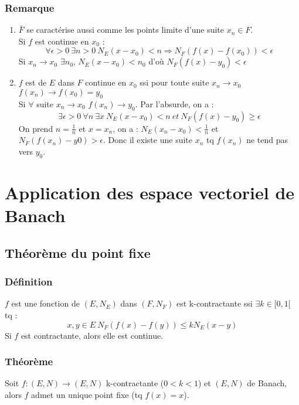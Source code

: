 \documentclass[a4paper, oneside]{report}
\newcommand{\ev}{espace vectoriel }
\newcommand{\fracun}[1]{\frac{1}{#1}}
\begin{document}
\subsubsection{Remarque}
\begin{enumerate}
\item $\bar{F}$ se caractérise aussi comme les points limite d'une suite $x_n\in F$.\\

Si $f$ est continue en $x_0$ :
$$\forall \epsilon >0~\exists n>0~N_E(x-x_0)<n\Rightarrow N_F(f(x)-f(x_0)) < \epsilon$$
Si $x_n\rightarrow x_0$ $\exists n_0$, $N_E(x-x_0)<n_0$ d'où $N_F(f(x)-y_0) < \epsilon$

\item $f$ est de $E$ dans $F$ continue en $x_0$ ssi pour toute suite $x_n\rightarrow x_0$ $f(x_n)\rightarrow f(x_0)=y_0$\\

Si $\forall$ suite $x_n\rightarrow x_0$ $f(x_n)\rightarrow y_0$. Par l'absurde, on a :
$$\exists \epsilon >0~\forall n~\exists x~ N_E(x-x_0)<n~et~N_F(f(x)-y_0)\geq \epsilon$$
On prend $n=\fracun{n}$ et $x=x_n$, on a : $N_E(x_n-x_0)<\fracun{n}$ et $N_F(f(x_n)-y0)>\epsilon$. Donc il existe une suite $x_n$ tq $f(x_n)$ ne tend pas vers $y_0$.

\end{enumerate}

\section{Application des \ev de Banach}

\subsection{Théorème du point fixe}

\subsubsection{Définition}

$f$ est une fonction de $(E,N_E)$ dans $(F,N_F)$ est k-contractante ssi $\exists k\in [0,1[$ tq :
$$x,y\in E~N_F(f(x)-f(y))\leq kN_E(x-y)$$
Si $f$ est contractante, alors elle est continue.
\subsubsection{Théorème}

Soit $f:(E,N) \rightarrow (E,N)$ k-contractante ($0< k<1$) et $(E,N)$ de Banach, alors $f$ admet un unique point fixe (tq $f(x)=x$).
\end{document}
